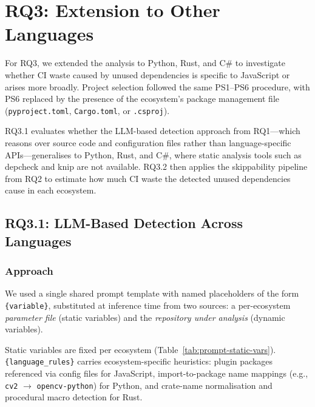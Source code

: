 \section{RQ3: Extension to Other Languages}
\label{sec:rq3}

For RQ3, we extended the analysis to Python, Rust, and C\# to investigate
whether CI waste caused by unused dependencies is specific to JavaScript or
arises more broadly.
Project selection followed the same PS1--PS6 procedure, with PS6 replaced by
the presence of the ecosystem's package management file
(\texttt{pyproject.toml}, \texttt{Cargo.toml}, or \texttt{.csproj}).

RQ3.1 evaluates whether the LLM-based detection approach from RQ1---which
reasons over source code and configuration files rather than
language-specific APIs---generalises to Python, Rust, and C\#, where static
analysis tools such as depcheck and knip are not available.
RQ3.2 then applies the skippability pipeline from RQ2 to estimate how much CI
waste the detected unused dependencies cause in each ecosystem.

\subsection{RQ3.1: LLM-Based Detection Across Languages}
\label{sec:rq3.1}

\subsubsection{Approach}
We used a single shared prompt template with named placeholders of the form
\texttt{\{variable\}}, substituted at inference time from two sources:
a per-ecosystem \emph{parameter file} (static variables) and the
\emph{repository under analysis} (dynamic variables).

Static variables are fixed per ecosystem (Table~\ref{tab:prompt-static-vars}).
\texttt{\{language\_rules\}} carries ecosystem-specific heuristics: plugin
packages referenced via config files for JavaScript, import-to-package name
mappings (e.g., \texttt{cv2} $\to$ \texttt{opencv-python}) for Python, and
crate-name normalisation and procedural macro detection for Rust.

